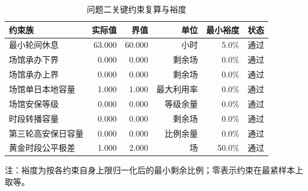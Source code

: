 \begin{table}[H]
\centering
\caption{问题二关键约束复算与裕度}
\label{tab:q2-constraint-audit}
\small
\begin{tabular}{lrrrrc}
\toprule
约束族 & 实际值 & 界值 & 单位 & 最小裕度 & 状态 \\
\midrule
最小轮间休息 & 63.000 & 60.000 & 小时 & 5.0\% & 通过 \\
场馆承办下界 & 0.000 & 0.000 & 剩余场 & 0.0\% & 通过 \\
场馆承办上界 & 0.000 & 0.000 & 剩余场 & 0.0\% & 通过 \\
场馆单日本地容量 & 1.000 & 1.000 & 最大利用率 & 0.0\% & 通过 \\
场馆安保等级 & 0.000 & 0.000 & 等级余量 & 0.0\% & 通过 \\
时段转播容量 & 0.000 & 0.000 & 剩余场 & 0.0\% & 通过 \\
第三轮高安保日容量 & 0.000 & 0.000 & 比例余量 & 0.0\% & 通过 \\
黄金时段公平极差 & 1.000 & 2.000 & 场 & 50.0\% & 通过 \\
\bottomrule
\end{tabular}
\vspace{2pt}
\noindent\begin{minipage}{0.96\textwidth}\footnotesize 注：裕度为按各约束自身上限归一化后的最小剩余比例；零表示约束在最紧样本上取等。\end{minipage}
\end{table}
